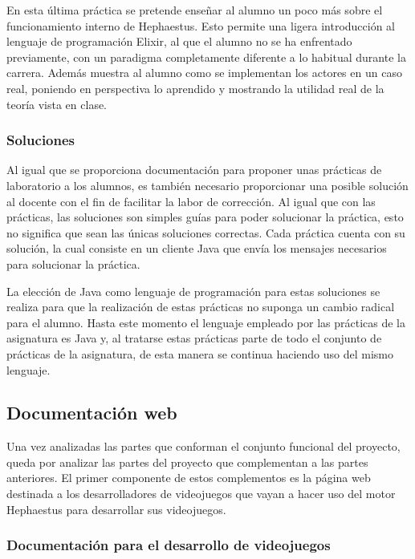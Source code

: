 En esta última práctica se pretende enseñar al alumno un poco más sobre el funcionamiento interno de Hephaestus. Esto permite una ligera introducción al lenguaje de programación Elixir, al que el alumno no se ha enfrentado previamente, con un paradigma completamente diferente a lo habitual durante la carrera. Además muestra al alumno como se implementan los actores en un caso real, poniendo en perspectiva lo aprendido y mostrando la utilidad real de la teoría vista en clase.

\subsubsection{Soluciones}

Al igual que se proporciona documentación para proponer unas prácticas de laboratorio a los alumnos, es también necesario proporcionar una posible solución al docente con el fin de facilitar la labor de corrección. Al igual que con las prácticas, las soluciones son simples guías para poder solucionar la práctica, esto no significa que sean las únicas soluciones correctas. Cada práctica cuenta con su solución, la cual consiste en un cliente Java que envía los mensajes necesarios para solucionar la práctica.

La elección de Java como lenguaje de programación para estas soluciones se realiza para que la realización de estas prácticas no suponga un cambio radical para el alumno. Hasta este momento el lenguaje empleado por las prácticas de la asignatura es Java y, al tratarse estas prácticas parte de todo el conjunto de prácticas de la asignatura, de esta manera se continua haciendo uso del mismo lenguaje.

\subsection{Documentación web}

Una vez analizadas las partes que conforman el conjunto funcional del proyecto, queda por analizar las partes del proyecto que complementan a las partes anteriores. El primer componente de estos complementos es la página web destinada a los desarrolladores de videojuegos que vayan a hacer uso del motor Hephaestus para desarrollar sus videojuegos.

\subsubsection{Documentación para el desarrollo de videojuegos}


